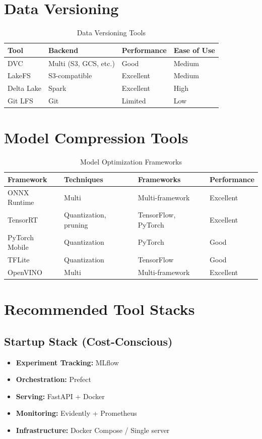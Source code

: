 \section{Data Versioning}

\begin{table}[h]
\centering
\caption{Data Versioning Tools}
\begin{tabular}{@{}llll@{}}
\toprule
\textbf{Tool} & \textbf{Backend} & \textbf{Performance} & \textbf{Ease of Use} \\
\midrule
DVC & Multi (S3, GCS, etc.) & Good & Medium \\
LakeFS & S3-compatible & Excellent & Medium \\
Delta Lake & Spark & Excellent & High \\
Git LFS & Git & Limited & Low \\
\bottomrule
\end{tabular}
\end{table}

\section{Model Compression Tools}

\begin{table}[h]
\centering
\caption{Model Optimization Frameworks}
\begin{tabular}{@{}llll@{}}
\toprule
\textbf{Framework} & \textbf{Techniques} & \textbf{Frameworks} & \textbf{Performance} \\
\midrule
ONNX Runtime & Multi & Multi-framework & Excellent \\
TensorRT & Quantization, pruning & TensorFlow, PyTorch & Excellent \\
PyTorch Mobile & Quantization & PyTorch & Good \\
TFLite & Quantization & TensorFlow & Good \\
OpenVINO & Multi & Multi-framework & Excellent \\
\bottomrule
\end{tabular}
\end{table}

\section{Recommended Tool Stacks}

\subsection{Startup Stack (Cost-Conscious)}
\begin{itemize}
    \item \textbf{Experiment Tracking:} MLflow
    \item \textbf{Orchestration:} Prefect
    \item \textbf{Serving:} FastAPI + Docker
    \item \textbf{Monitoring:} Evidently + Prometheus
    \item \textbf{Infrastructure:} Docker Compose / Single server
\end{itemize}

